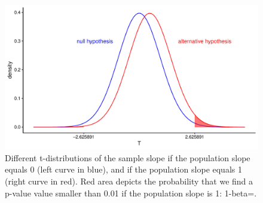 \documentclass[]{book}\usepackage[]{graphicx}\usepackage[]{color}
\makeatletter
\def\maxwidth{ %
  \ifdim\Gin@nat@width>\linewidth
    \linewidth
  \else
    \Gin@nat@width
  \fi
}
\newenvironment{knitrout}{}{} %
\makeatother
\begin{document}
\begin{knitrout}
\color{fgcolor}\begin{figure}

{\centering \includegraphics[width=\maxwidth]{figure/inf_23-1} 

}

\caption[Different t-distributions of the sample slope if the population slope equals 0 (left curve in blue), and if the population slope equals 1 (right curve in red)]{Different t-distributions of the sample slope if the population slope equals 0 (left curve in blue), and if the population slope equals 1 (right curve in red). Red area depicts the probability that we find a p-value value smaller than 0.01 if the population slope is 1: 1-beta=.}\label{fig:inf_23}
\end{figure}


\end{knitrout}
\end{document}
